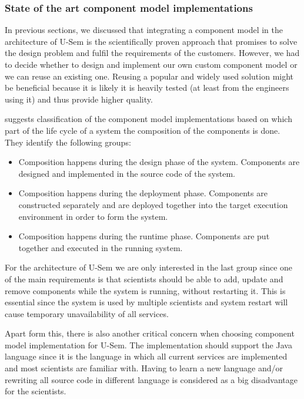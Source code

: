 \subsubsection{State of the art component model implementations}

In previous sections, we discussed that integrating a component model in the architecture of U-Sem is the scientifically proven approach that promises to solve the design problem and fulfil the requirements of the customers. However, we had to decide whether to design and implement our own custom component model or we can reuse an existing one. Reusing a popular and widely used solution might be beneficial because it is likely it is heavily tested (at least from the engineers using it) and thus provide higher quality. 

\cite{lau2007software} suggests classification of the component model implementations based on which part of the life cycle of a system the composition of the components is done. They identify the following groups:

\begin{itemize}
	\item  Composition happens during the design phase of the system. Components are designed and implemented in the source code of the system.
	\item  Composition happens during the deployment phase. Components are constructed separately and are deployed together into the target execution environment in order to form the system.
	\item Composition happens during the runtime phase. Components are put together and executed in the running system.
\end{itemize}

For the architecture of U-Sem we are only interested in the last group since one of the main requirements is that scientists should be able to add, update and remove components while the system is running, without restarting it. This is essential since the system is used by multiple scientists and system restart will cause temporary unavailability of all services. 

Apart form this, there is also another critical concern when choosing component model implementation for U-Sem. The implementation should support the Java language since it is the language in which all current services are implemented and most scientists are familiar with. Having to learn a new language and/or rewriting all source code in different language is considered as a big disadvantage for the scientists.

